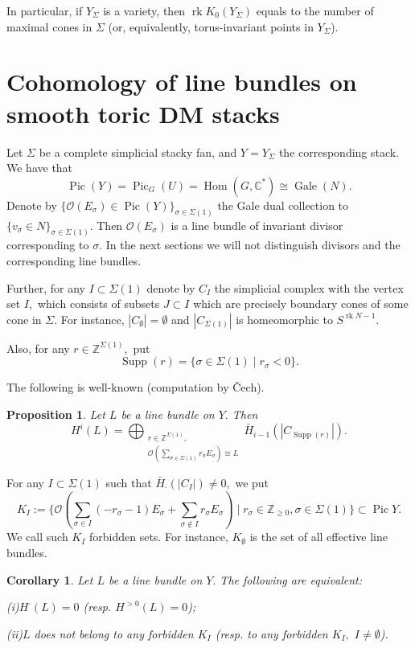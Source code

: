 \documentclass[11pt,leqno]{amsart}
\newtheorem{prop}[theo]{Proposition}
\newtheorem{cor}[theo]{Corollary}
\numberwithin{equation}{section}
\def\C{\mathbb{C}}
\def\Z{\mathbb{Z}}
\def\Hom{\operatorname{Hom}}
\newcommand{\cO}{{\mathcal O}}
\newcommand{\supp}{\operatorname{Supp}}
\newcommand{\Pic}{\operatorname{Pic}}
\newcommand{\rk}{\operatorname{rk}}
\newcommand{\Gale}{\operatorname{Gale}}
\begin{document}
In particular, if $Y_{\Sigma}$ is a variety, then $\rk K_0(Y_{\Sigma})$ equals to the number of maximal cones in $\Sigma$ (or, equivalently,
torus-invariant points in $Y_{\Sigma}$).

\section{Cohomology of line bundles on smooth toric DM stacks}
\label{cohomology}

Let $\Sigma$ be a complete simplicial stacky fan, and $Y=Y_{\Sigma}$ the corresponding stack.
We have that
$$\Pic(Y)=\Pic_{G}(U)=\Hom(G,\C^*)\cong\Gale(N).$$
Denote by $\{\cO(E_{\sigma})\in\Pic(Y)\}_{\sigma\in\Sigma(1)}$ the Gale dual collection to $\{v_{\sigma}\in N\}_{\sigma\in\Sigma(1)}.$
Then $\cO(E_{\sigma})$ is a line bundle of invariant divisor corresponding to $\sigma.$
In the next sections we will not distinguish divisors and the corresponding line bundles.

Further, for any $I\subset\Sigma(1)$ denote by $C_I$ the simplicial complex with the vertex set $I,$ which consists
of subsets $J\subset I$ which are precisely boundary cones of some cone in $\Sigma.$ For instance, $|C_{\emptyset}|=\emptyset$
and $|C_{\Sigma(1)}|$ is homeomorphic to $S^{\rk N-1}.$

Also, for any $r\in\Z^{\Sigma(1)},$ put
$$\supp(r)=\{\sigma\in\Sigma(1)\mid r_{\sigma}<0\}.$$

The following is well-known (computation by \v{C}ech).

\begin{prop}\label{Czech}Let $L$ be a line bundle on $Y.$ Then
$$H^i(L)=\bigoplus_{\substack{r\in\Z^{\Sigma(1)},\\
\cO(\sum\limits_{\sigma\in\Sigma(1)}r_{\sigma}E_{\sigma})\cong L}}\bar{H}_{i-1}(|C_{\supp(r)}|).$$\end{prop}

For any $I\subset \Sigma(1)$ such that $\bar{H}_{\cdot}(|C_I|)\ne 0,$ we put
\begin{equation}K_I:=\{\cO(\sum\limits_{\sigma\in I}(-r_{\sigma}-1)E_{\sigma}+\sum\limits_{\sigma\notin I}r_{\sigma}E_{\sigma})\mid r_{\sigma}\in\Z_{\geq 0},\sigma\in\Sigma(1)\}\subset\Pic Y.\end{equation}
We call such $K_I$ forbidden sets. For instance, $K_{\emptyset}$ is the set of all effective line bundles.

\begin{cor}\label{non-trivial_cohom}Let $L$ be a line bundle on $Y.$ The following are equivalent:

(i)$H^{\cdot}(L)=0$ (resp. $H^{>0}(L)=0$);

(ii)$L$ does not belong to any forbidden $K_I$ (resp. to any forbidden $K_I,$ $I\ne\emptyset$).\end{cor}
\end{document}
